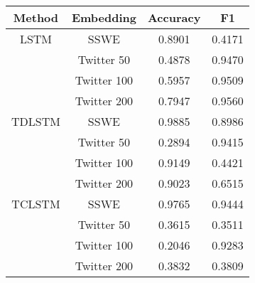 \begin{tabular}{|c|c|c|c|}
\hline
Method     & Embedding &  Accuracy &      F1 \\
\hline
LSTM & SSWE &    0.8901 &  0.4171 \\
& Twitter 50 &    0.4878 &  0.9470 \\
& Twitter 100 &    0.5957 &  0.9509 \\
& Twitter 200 &    0.7947 &  0.9560 \\
\hline
TDLSTM & SSWE &    0.9885 &  0.8986 \\
& Twitter 50 &    0.2894 &  0.9415 \\
& Twitter 100 &    0.9149 &  0.4421 \\
& Twitter 200 &    0.9023 &  0.6515 \\
\hline
TCLSTM & SSWE &    0.9765 &  0.9444 \\
& Twitter 50 &    0.3615 &  0.3511 \\
& Twitter 100 &    0.2046 &  0.9283 \\
& Twitter 200 &    0.3832 &  0.3809 \\
\hline
\end{tabular}